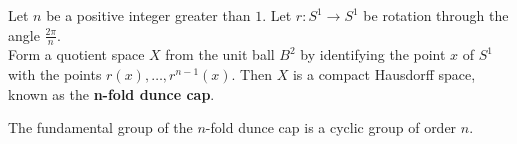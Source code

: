 \begin{definition}
Let $n$ be a positive integer greater than $1$. Let $r\colon S^1 \rightarrow S^1$ be rotation through the angle $\frac{2\pi }{n}$. \\

Form a quotient space $X$ from the unit ball $B^2$ by identifying the point $x$ of $S^1$ with the points $r(x), \dots, r^{n-1}(x)$. Then $X$ is a compact Hausdorff space, known as the
\textbf{n-fold dunce cap}.
\end{definition}

\begin{theorem}
The fundamental group of the $n$-fold dunce cap is a cyclic group of order $n$.
\end{theorem}

